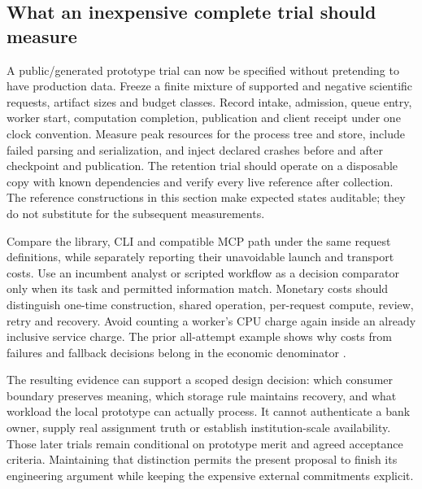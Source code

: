 \subsection{What an inexpensive complete trial should measure}

A public/generated prototype trial can now be specified without pretending
to have production data. Freeze a finite mixture of supported and negative
scientific requests, artifact sizes and budget classes. Record intake,
admission, queue entry, worker start, computation completion, publication
and client receipt under one clock convention. Measure peak resources for
the process tree and store, include failed parsing and serialization, and
inject declared crashes before and after checkpoint and publication. The
retention trial should operate on a disposable copy with known dependencies
and verify every live reference after collection. The reference constructions
in this section make expected states auditable; they do not substitute for
the subsequent measurements.

Compare the library, CLI and compatible MCP path under the same request
definitions, while separately reporting their unavoidable launch and
transport costs. Use an incumbent analyst or scripted workflow as a
decision comparator only when its task and permitted information match.
Monetary costs should distinguish one-time construction, shared operation,
per-request compute, review, retry and recovery. Avoid counting a worker's
CPU charge again inside an already inclusive service charge. The prior
all-attempt example shows why costs from failures and fallback decisions
belong in the economic denominator \citep{exec13_ops_exact}.

The resulting evidence can support a scoped design decision: which consumer
boundary preserves meaning, which storage rule maintains recovery, and what
workload the local prototype can actually process. It cannot authenticate a
bank owner, supply real assignment truth or establish institution-scale
availability. Those later trials remain conditional on prototype merit and
agreed acceptance criteria. Maintaining that distinction permits the present
proposal to finish its engineering argument while keeping the expensive
external commitments explicit.
\label{exec17:i4-capacity-end}


